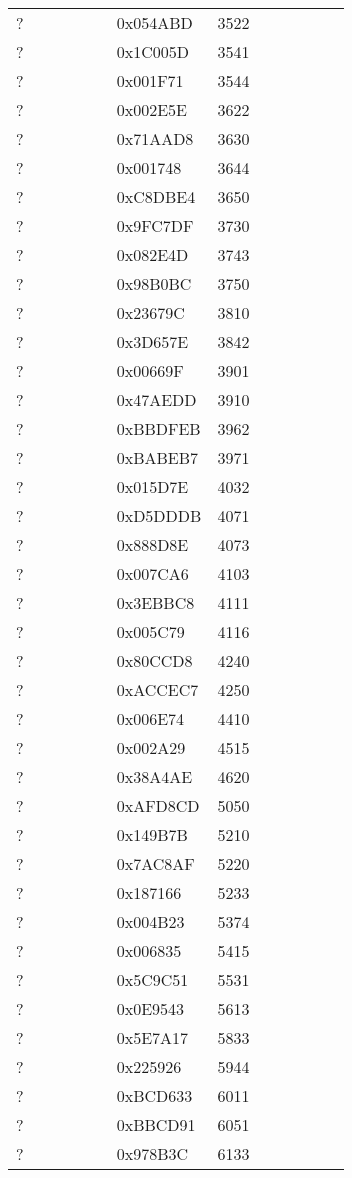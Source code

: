 \begin{longtable}{p{0.3\linewidth} p{0.3\linewidth} p{0.4\linewidth}}
? & 0x054ABD & 3522\\
? & 0x1C005D & 3541\\
? & 0x001F71 & 3544\\
? & 0x002E5E & 3622\\
? & 0x71AAD8 & 3630\\
? & 0x001748 & 3644\\
? & 0xC8DBE4 & 3650\\
? & 0x9FC7DF & 3730\\
? & 0x082E4D & 3743\\
? & 0x98B0BC & 3750\\
? & 0x23679C & 3810\\
? & 0x3D657E & 3842\\
? & 0x00669F & 3901\\
? & 0x47AEDD & 3910\\
? & 0xBBDFEB & 3962\\
? & 0xBABEB7 & 3971\\
? & 0x015D7E & 4032\\
? & 0xD5DDDB & 4071\\
? & 0x888D8E & 4073\\
? & 0x007CA6 & 4103\\
? & 0x3EBBC8 & 4111\\
? & 0x005C79 & 4116\\
? & 0x80CCD8 & 4240\\
? & 0xACCEC7 & 4250\\
? & 0x006E74 & 4410\\
? & 0x002A29 & 4515\\
? & 0x38A4AE & 4620\\
? & 0xAFD8CD & 5050\\
? & 0x149B7B & 5210\\
? & 0x7AC8AF & 5220\\
? & 0x187166 & 5233\\
? & 0x004B23 & 5374\\
? & 0x006835 & 5415\\
? & 0x5C9C51 & 5531\\
? & 0x0E9543 & 5613\\
? & 0x5E7A17 & 5833\\
? & 0x225926 & 5944\\
? & 0xBCD633 & 6011\\
? & 0xBBCD91 & 6051\\
? & 0x978B3C & 6133\\

\end{longtable}
